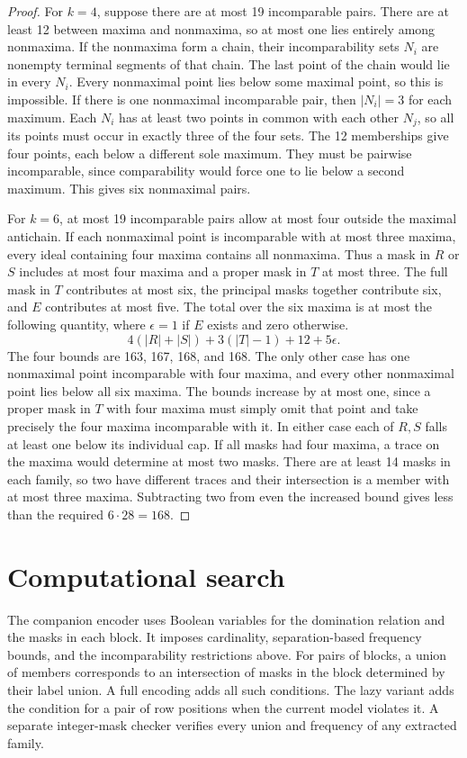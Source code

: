 \documentclass[10pt]{article}
\begin{document}
\begin{proof}
For \(k=4\), suppose there are at most 19 incomparable pairs.
There are at least 12 between maxima and nonmaxima, so at most one
lies entirely among nonmaxima. If the nonmaxima form a chain, their
incomparability sets \(N_i\) are nonempty terminal segments of that
chain. The last point of the chain would lie in every \(N_i\).
Every nonmaximal point lies below some maximal point, so this is
impossible. If there is one nonmaximal
incomparable pair, then \(|N_i|=3\) for each maximum. Each \(N_i\)
has at least two points in common with each other \(N_j\), so all its
points must occur in exactly three of the four sets. The 12
memberships give four points, each below a different sole maximum.
They must be pairwise incomparable, since comparability would force
one to lie below a second maximum. This gives six nonmaximal pairs.

For \(k=6\), at most 19 incomparable pairs allow at most four outside
the maximal antichain. If each nonmaximal point is incomparable with
at most three maxima, every ideal containing four maxima contains
all nonmaxima. Thus a mask in \(R\) or \(S\) includes at most four maxima
and a proper mask in \(T\) at most three. The full mask in \(T\)
contributes at most six, the principal masks together contribute
six, and \(E\) contributes at most five. The total over the six maxima
is at most the following quantity, where \(\epsilon=1\) if \(E\) exists
and zero otherwise.
\[
4(|R|+|S|)+3(|T|-1)+12+5\epsilon.
\]
The four bounds are 163, 167, 168, and 168. The only other case has
one nonmaximal point incomparable with four maxima, and every other
nonmaximal point lies below all six maxima. The bounds increase by
at most one, since a proper mask in \(T\) with four maxima must simply
omit that point and take precisely the four maxima incomparable
with it. In either case each of \(R,S\) falls at least one below its
individual cap. If all masks had four maxima, a trace on the maxima
would determine at most two masks. There are at least 14 masks in
each family, so two have different traces and their intersection is
a member with at most three maxima. Subtracting two from even
the increased bound gives less than the required \(6\cdot28=168\).
\end{proof}

\section{Computational search}
The companion encoder uses Boolean variables for the domination
relation and the masks in each block. It imposes cardinality,
separation-based frequency bounds, and the incomparability restrictions
above. For pairs of blocks, a union of members corresponds to an
intersection of masks in the block determined by their label union.
A full encoding adds all such conditions. The lazy variant adds the
condition for a pair of row positions when the current model violates
it. A separate integer-mask checker verifies every union and frequency
of any extracted family.
\end{document}
